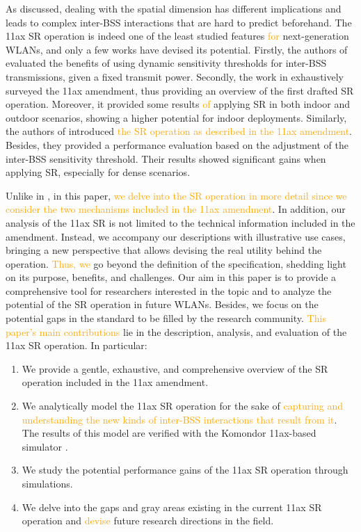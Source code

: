 \documentclass{ieeeaccess}
\begin{document}
As discussed, dealing with the spatial dimension has different implications and leads to complex inter-BSS interactions that are hard to predict beforehand. The 11ax SR operation is indeed one of the least studied features \textcolor{orange}{for} next-generation WLANs, and only a few works have devised its potential. Firstly, the authors of \cite{mori2014performance} evaluated the benefits of using dynamic sensitivity thresholds for inter-BSS transmissions, given a fixed transmit power. Secondly, the work in \cite{qu2018survey} exhaustively surveyed the 11ax amendment, thus providing an overview of the first drafted SR operation. Moreover, it provided some results \textcolor{orange}{of} applying SR in both indoor and outdoor scenarios, showing a higher potential for indoor deployments. Similarly, the authors of \cite{shen2018research} introduced \textcolor{orange}{the SR operation as described in the 11ax amendment}. Besides, they provided a performance evaluation based on the adjustment of the inter-BSS sensitivity threshold. Their results showed significant gains when applying SR, especially for dense scenarios. 

Unlike in \cite{mori2014performance, qu2018survey, shen2018research}, in this paper, \textcolor{orange}{we delve into the SR operation in more detail since we consider the two mechanisms included in the 11ax amendment}. In addition, our analysis of the 11ax SR is not limited to the technical information included in the amendment. Instead, we accompany our descriptions with illustrative use cases, bringing a new perspective that allows devising the real utility behind the operation. \textcolor{orange}{Thus, we} go beyond the definition of the specification, shedding light on its purpose, benefits, and challenges. Our aim in this paper is to provide a comprehensive tool for researchers interested in the topic and to analyze the potential of the SR operation in future WLANs. Besides, we focus on the potential gaps in the standard to be filled by the research community. \textcolor{orange}{This paper's main contributions} lie in the description, analysis, and evaluation of the 11ax SR operation. In particular:
\begin{enumerate}
	\item We provide a gentle, exhaustive, and comprehensive overview of the SR operation included in the 11ax amendment.
	\item We analytically model the 11ax SR operation for the sake of \textcolor{orange}{capturing and understanding the new kinds of inter-BSS interactions that result from it}. The results of this model are verified with the Komondor 11ax-based simulator \cite{barrachina2019komondor}.
	\item We study the potential performance gains of the 11ax SR operation through simulations. 
	\item We delve into the gaps and gray areas existing in the current 11ax SR operation and \textcolor{orange}{devise} future research directions in the field.
\end{enumerate}
\end{document}
